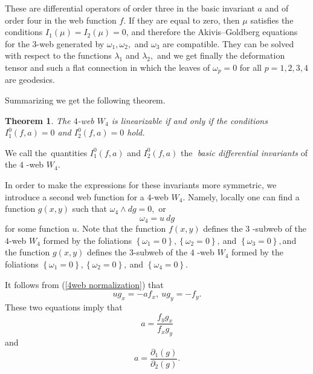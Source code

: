 \documentclass{article}
\newtheorem{theorem}{Theorem}
\begin{document}
These are differential operators of order three in the basic invariant $a$
and of order four in the web function $f.$ If they are equal to zero, then $%
\mu $ satisfies the conditions $I_{1}(\mu )=I_{2}(\mu )=0$, and therefore
the Akivis--Goldberg equations for the $3$-web generated by $\omega
_{1},\omega _{2},$ and $\omega _{3}$ are compatible. They can be solved with
respect to the functions $\lambda _{1}$ and $\lambda _{2},$ and we get
finally the deformation tensor and such a flat connection in which the
leaves of $\omega _{p}=0$ for all $p=1,2,3,4$ are geodesics.

Summarizing we get the following theorem.

\begin{theorem}
The $4$-web $W_{4}$ is linearizable if and only if the conditions $%
I_{1}^{0}\left( f,a\right) =0$ and $I_{2}^{0}\left( f,a\right) =0$ hold.
\end{theorem}

We call the\ quantities $I_{1}^{0}\left( f,a\right) $ and $I_{2}^{0}\left(
f,a\right) $ the\textbf{\ }\emph{basic differential invariants} of the $4$%
-web $W_{4}$.

In order to make the expressions for these invariants more symmetric, we
introduce a second web function for a $4$-web $W_{4}$. Namely, locally one
can find a function $g(x,y)$ such that $\omega _{4}\wedge dg=0,$ or
\begin{equation*}
\omega _{4}=u~dg
\end{equation*}
for some function $u.$ Note that the function $f(x,y)$ defines the $3$%
-subweb of the $4$-web $W_{4}$ formed by the foliations $\left\{ \omega
_{1}=0\right\} ,\left\{ \omega _{2}=0\right\} ,\ $and $\left\{ \omega
_{3}=0\right\} ,$and the function $g(x,y)$ defines the $3$-subweb of the $4$%
-web $W_{4}$ formed by the foliations $\left\{ \omega _{1}=0\right\}
,\left\{ \omega _{2}=0\right\} ,\ $and $\left\{ \omega _{4}=0\right\} .$

It follows from (\ref{4web normalization}) that
\begin{equation*}
ug_{x}=-af_{x},\ ug_{y}=-f_{y}.
\end{equation*}
These two equations imply that
\begin{equation*}
a=\frac{f_{y}g_{x}}{f_{x}g_{y}}
\end{equation*}
and
\begin{equation}
a=\frac{\partial _{1}\left( g\right) }{\partial _{2}\left( g\right) }.
\label{a-invariant}
\end{equation}
\end{document}
